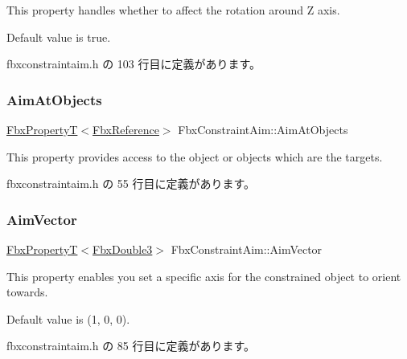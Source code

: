 This property handles whether to affect the rotation around Z axis.

Default value is true. 

 fbxconstraintaim.\+h の 103 行目に定義があります。

\mbox{\label{class_fbx_constraint_aim_a502a01a00e7756b82d697e881fb21504}} 
\subsubsection{\texorpdfstring{Aim\+At\+Objects}{AimAtObjects}}
{\footnotesize\ttfamily \hyperlink{class_fbx_property_t}{Fbx\+PropertyT}$<$\hyperlink{fbxtypes_8h_a44df6a2eec915cf27cd481e5c5e48a24}{Fbx\+Reference}$>$ Fbx\+Constraint\+Aim\+::\+Aim\+At\+Objects}

This property provides access to the object or objects which are the targets. 

 fbxconstraintaim.\+h の 55 行目に定義があります。

\mbox{\label{class_fbx_constraint_aim_a7d4ef157e40e8bcb8f1cb3f12f8f9b01}} 
\subsubsection{\texorpdfstring{Aim\+Vector}{AimVector}}
{\footnotesize\ttfamily \hyperlink{class_fbx_property_t}{Fbx\+PropertyT}$<$\hyperlink{fbxtypes_8h_ae0a96f14cde566774c7553aa7523b7a7}{Fbx\+Double3}$>$ Fbx\+Constraint\+Aim\+::\+Aim\+Vector}

This property enables you set a specific axis for the constrained object to orient towards.

Default value is (1, 0, 0). 

 fbxconstraintaim.\+h の 85 行目に定義があります。

\mbox{\label{class_fbx_constraint_aim_ae1e8704e4e04529a254e91080a2a19c1}} 

